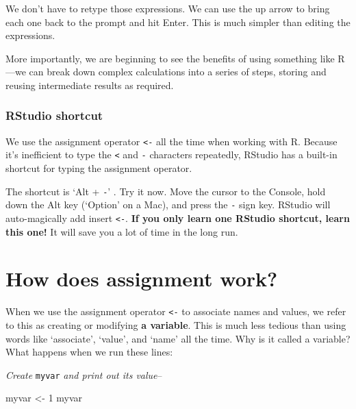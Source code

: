 \documentclass[
]{book}
\newenvironment{Shaded}{\begin{snugshade}}{\end{snugshade}}
\newcommand{\DecValTok}[1]{\textcolor[rgb]{0.00,0.00,0.81}{#1}}
\newcommand{\NormalTok}[1]{#1}
\newcommand{\OtherTok}[1]{\textcolor[rgb]{0.56,0.35,0.01}{#1}}
\newenvironment{greybox}{
  \definecolor{shadecolor}{rgb}{0.95,0.95,0.95}  %
  \color{black}
  \begin{shaded}}
 {\end{shaded}}
\newenvironment{infobox}[1]
  {
  \begin{itemize}
  \renewcommand{\labelitemi}{
    \raisebox{-.7\height}[0pt][0pt]{
      {\setkeys{Gin}{width=3em,keepaspectratio}
        \texttt{[image: images/\#1]}}
    }
  }
  \setlength{\fboxsep}{1em}
  \begin{greybox}
  \item
  }
  {
  \end{greybox}
  \end{itemize}
  }
\begin{document}
We don't have to retype those expressions. We can use the up arrow to bring each one back to the prompt and hit Enter. This is much simpler than editing the expressions.

More importantly, we are beginning to see the benefits of using something like R---we can break down complex calculations into a series of steps, storing and reusing intermediate results as required.

\begin{infobox}{action}

\hypertarget{rstudio-shortcut}{%
\subsubsection*{RStudio shortcut}\label{rstudio-shortcut}}

We use the assignment operator \texttt{\textless{}-} all the time when working with R. Because it's inefficient to type the \texttt{\textless{}} and \texttt{-} characters repeatedly, RStudio has a built-in shortcut for typing the assignment operator.

The shortcut is `Alt + \texttt{-}' . Try it now. Move the cursor to the Console, hold down the Alt key (`Option' on a Mac), and press the \texttt{-} sign key. RStudio will auto-magically add insert \texttt{\textless{}-}. \textbf{If you only learn one RStudio shortcut, learn this one!} It will save you a lot of time in the long run.

\end{infobox}

\hypertarget{how-does-assignment-work}{%
\section{How does assignment work?}\label{how-does-assignment-work}}

When we use the assignment operator \texttt{\textless{}-} to associate names and values, we refer to this as creating or modifying \textbf{a variable}. This is much less tedious than using words like `associate', `value', and `name' all the time. Why is it called a variable? What happens when we run these lines:

\emph{Create} \texttt{myvar} \emph{and print out its value}--

\begin{Shaded}
\begin{Highlighting}[]
\NormalTok{myvar }\OtherTok{\textless{}{-}} \DecValTok{1}
\NormalTok{myvar}
\end{Highlighting}
\end{Shaded}
\end{document}
